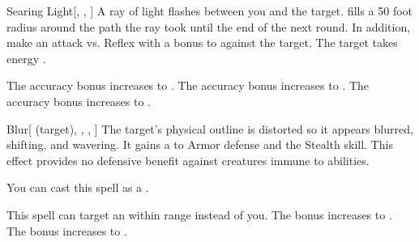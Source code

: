 \lowercase{\hypertarget{spell:Searing Light}{}}\label{spell:Searing Light}
\begin{freeability}[Rank 1]{\hypertarget{spell:Searing Light}{Searing Light}}[, , ]
A ray of light flashes between you and the target.
 fills a 50 foot radius around the path the ray took until the end of the next round.
In addition, make an attack vs. Reflex with a  bonus to  against the target.
\hit The target takes energy .

\rankline
{} The accuracy bonus increases to .
 The accuracy bonus increases to .
 The accuracy bonus increases to .

\end{freeability}
\vspace{0.25em}



\lowercase{\hypertarget{spell:Blur}{}}\label{spell:Blur}
\begin{attuneability}[Rank 2]{\hypertarget{spell:Blur}{Blur}}[ (target), , , ]
The target's physical outline is distorted so it appears blurred, shifting, and wavering.
It gains a   to Armor defense and the Stealth skill.
This effect provides no defensive benefit against creatures immune to  abilities.

You can cast this spell as a .

\rankline
{} This spell can target an  within \rngmed range instead of you.
 The bonus increases to .
 The bonus increases to .

\end{attuneability}
\vspace{0.25em}



